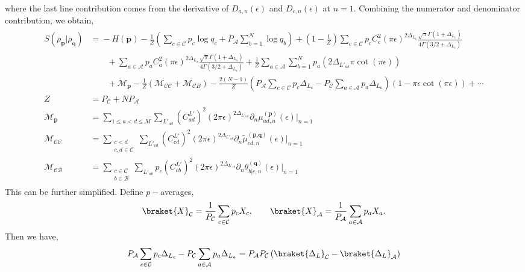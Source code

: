 \documentclass[11pt]{article}
\newcommand{\ep}{\epsilon}
\newcommand{\p}{\partial}
\newcommand{\lb}{\left(}
\newcommand{\rb}{\right)}
\begin{document}
where the last line contribution comes from the derivative of $D_{a,n}(\ep)$ and $D_{c,n}(\ep)$ at $n=1$.
Combining the numerator and denominator contribution, we obtain,
\begin{align}
\begin{aligned}
S(\bar\rho_{\textbf{p}} | \bar\rho_{\textbf{q}})
&={}-H(\textbf{p})
-\frac{1}{Z}\lb
\sum_{c\in\mathcal{C}}p_c\log q_c
+P_\mathcal{A}\sum_{b=1}^N\log q_b
\rb
+\lb1-\frac{1}{Z}\rb
\sum_{c\in\mathcal{C}}p_c C_c^2
(\pi\ep)^{2\Delta_{L_c}}
\frac{\sqrt \pi \Gamma(1+ \Delta_{L_c})}{4\Gamma(3/2 + \Delta_{L_c})} 
\\
&\qquad
+\sum_{a\in\mathcal{A}}p_a C_a^2
(\pi\ep)^{2\Delta_{L_a}}
\frac{\sqrt \pi \Gamma(1+ \Delta_{L_a})}{4\Gamma(3/2 + \Delta_{L_a})} 
+\frac{1}{Z}
\sum_{a\in\mathcal{A}}\sum_{b=1}^N
p_a\lb2\Delta_{L'_{ab}}\pi\cot(\pi\ep)\rb\\&\qquad
+\mathcal{M}_{\textbf{p}}
-\frac{1}{Z}\lb
\mathcal{M}_{\mathcal{C}\mathcal{C}}
+\mathcal{M}_{\mathcal{C}B}
\rb  -\frac{2(N-1)}{Z} \lb  P_\mathcal{A}\sum_{c\in\mathcal{C}} p_c\Delta_{L_c} - P_\mathcal{C} \sum_{a\in\mathcal{A}} p_a\Delta_{L_a} \rb (1-\pi \ep\cot(\pi\ep)) + \cdots\\
Z &=  P_\mathcal{C} + NP_\mathcal{A} \\
\mathcal{M}_\textbf{p} &= \sum_{1\leq a<d\leq M}\sum_{L'_{ad}} \lb C_{ad}^{L'}\rb^2 (2\pi\ep)^{2\Delta_{L'_{ad}}}\p_n\mu_{ad,n}^{(\textbf{p})}(\ep)\Big|_{n=1} \\ 
\mathcal{M}_{\mathcal{C}\mathcal{C}} &= \sum_{\substack{c<d \\ c,d\in \mathcal{C}}}\sum_{L'_{cd}} \lb C_{cd}^{L'}\rb^2 (2\pi\ep)^{2\Delta_{L'_{cd}}} \p_n\tilde \mu_{cd,n}^{(\textbf{p,q})}(\ep)\Big|_{n=1} \\
\mathcal{M}_{\mathcal{C}\mathcal{B}} &= \sum_{\substack{c\in \mathcal{C} \\ b\in \mathcal{B}}} \sum_{L'_{ab}} p_c\lb C^{L'}_{cb}\rb^2 (2\pi\ep)^{2\Delta_{L'_{cb}}}\p_n  \theta_{b|c,n}^{(\textbf{q})}(\ep) \Big|_{n=1}
\end{aligned}
\end{align}
This can be further simplified. Define $p-$averages, 
\begin{align}
    \braket{X}_\mathcal{C} = \frac{1}{P_\mathcal{C}} \sum_{c\in \mathcal{C}}p_c X_c, \qquad \braket{X}_\mathcal{A} = \frac{1}{P_\mathcal{A}} \sum_{a\in \mathcal{A}}p_a X_a.
\end{align}
Then we have,
\begin{align}
    P_\mathcal{A} \sum_{c\in \mathcal{C}}p_c \Delta_{L_c} - P_\mathcal{C}\sum_{a\in \mathcal{A}} p_a \Delta_{L_a} = P_\mathcal{A} P_\mathcal{C} \lb \braket{\Delta_L}_{\mathcal{C}} - \braket{\Delta_L}_\mathcal{A}\rb 
\end{align}
\end{document}
